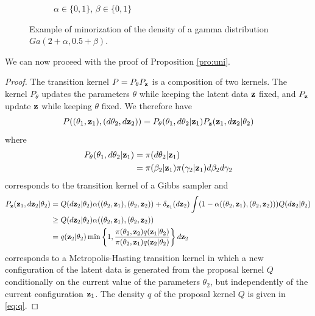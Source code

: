 \documentclass[11pt]{article}
\begin{document}
\begin{figure}
\begin{subfigure}[b]{0.32\textwidth}
			\caption{$\alpha \in \{0,1\}$, $\beta \in \{0,1\}$}
		\label{fig:gam2}
		\end{subfigure}
		\caption{Example of minorization of the density of a gamma distribution $Ga(2+\alpha, 0.5+\beta)$.}
		\label{fig:gam}
	\end{figure}
	
	We can now proceed with the proof of Proposition \ref{pro:uni}.
	
	\begin{proof}
		The transition kernel $P = P_{\theta} P_{\mathbf{z}}$ is a composition of two kernels. The kernel $P_{\theta}$ updates the parameters $\theta$ while keeping the latent data $\mathbf{z}$ fixed, and $P_{\mathbf{z}}$ update $\mathbf{z}$ while keeping $\theta$ fixed. %
		We therefore have
		$$P((\theta_1, \mathbf{z}_1), (d\theta_2, d\mathbf{z}_2)) = P_\theta(\theta_1, d\theta_2 | \mathbf{z}_1) P_{\mathbf{z}}(\mathbf{z}_1, d\mathbf{z}_2 | \theta_2)$$
		where
		\begin{align}
		\label{eq:Pth}
		    P_\theta(\theta_1, d\theta_2 | \mathbf{z}_1)
		    & = \pi(d\theta_2 | \mathbf{z}_1) \\
		    & = \pi(\beta_2 | \mathbf{z}_1) \pi(\gamma_2 | \mathbf{z}_1) d\beta_2 d\gamma_2 \nonumber
		\end{align}
		corresponds to the transition kernel of a Gibbs sampler and
		\begin{align}
		\label{eq:Pz}
		    P_{\mathbf{z}}(\mathbf{z}_1, d\mathbf{z}_2 | \theta_2)
		    & = Q(d\mathbf{z}_2 | \theta_2) \alpha((\theta_2, \mathbf{z}_1),(\theta_2, \mathbf{z}_2)) + \delta_{\mathbf{z}_1}(d\mathbf{z}_2)\int(1-\alpha((\theta_2, \mathbf{z}_1),(\theta_2, \mathbf{z}_2))) Q(d\mathbf{z}_2| \theta_2) \nonumber \\
			& \ge Q(d\mathbf{z}_2| \theta_2) \alpha((\theta_2, \mathbf{z}_1),(\theta_2, \mathbf{z}_2)) \\
			& = q(\mathbf{z}_2| \theta_2) \min\left\lbrace 1, \dfrac{\pi(\theta_2, \mathbf{z}_2)q(\mathbf{z}_1| \theta_2)}{\pi(\theta_2, \mathbf{z}_1)q(\mathbf{z}_2| \theta_2)} \right\rbrace d\mathbf{z}_2 \nonumber
		\end{align}
		corresponds to a Metropolis-Hasting transition kernel in which a new configuration of the latent data is generated from the proposal kernel $Q$ conditionally on the current value of the parameters $\theta_2$, but independently of the current configuration $\mathbf{z}_1$. The density $q$ of the proposal kernel $Q$ is given in \eqref{eq:q}.
		

\end{proof}
\end{document}
